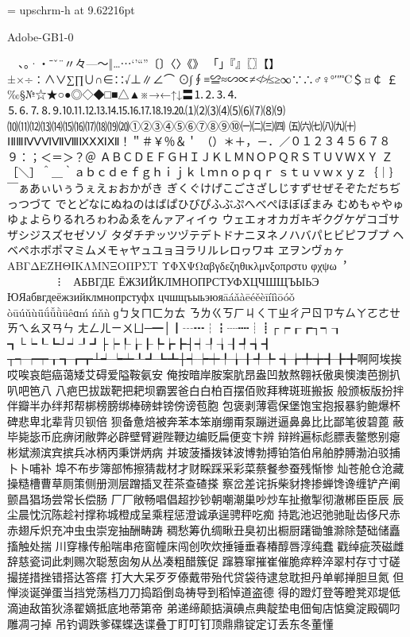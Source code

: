 %
%
%
\font\upschrm = upschrm-h at 9.62216pt
\upschrm

Adobe-GB1-0

　、。·・ˉˇ¨〃々—～‖…⋯‘’“”〔〕〈〉《》
「」『』〖〗【】±×÷∶∧∨∑∏∪∩∈∷√⊥∥∠⌒
⊙∫∮≡≌≈∽∝≠≮≯≤≥∞∵∴♂♀°′″℃＄¤￠
￡‰§№☆★○●◎◇◆□■△▲※→←↑↓〓⒈⒉⒊⒋
⒌⒍⒎⒏⒐⒑⒒⒓⒔⒕⒖⒗⒘⒙⒚⒛⑴⑵⑶⑷⑸⑹⑺⑻⑼
⑽⑾⑿⒀⒁⒂⒃⒄⒅⒆⒇①②③④⑤⑥⑦⑧⑨⑩㈠㈡㈢㈣
㈤㈥㈦㈧㈨㈩ⅠⅡⅢⅣⅤⅥⅦⅧⅨⅩⅪⅫ！＂＃￥％＆＇
（）＊＋，－．／０１２３４５６７８９：；＜＝＞？＠
ＡＢＣＤＥＦＧＨＩＪＫＬＭＮＯＰＱＲＳＴＵＶＷＸＹ
Ｚ［＼］＾＿｀ａｂｃｄｅｆｇｈｉｊｋｌｍｎｏｐｑｒ
ｓｔｕｖｗｘｙｚ｛｜｝￣ぁあぃいぅうぇえぉおかがき
ぎくぐけげこごさざしじすずせぜそぞただちぢっつづて
でとどなにぬねのはばぱひびぴふぶぷへべぺほぼぽまみ
むめもゃやゅゆょよらりるれろゎわゐゑをんァアィイゥ
ウェエォオカガキギクグケゲコゴサザシジスズセゼソゾ
タダチヂッツヅテデトドナニヌネノハバパヒビピフブプ
ヘベペホボポマミムメモャヤュユョヨラリルレロヮワヰ
ヱヲンヴヵヶΑΒΓΔΕΖΗΘΙΚΛΜΝΞΟΠΡΣΤ
ΥΦΧΨΩαβγδεζηθικλμνξοπρστυ
φχψω︐︒︑︓︔︕︖︵︶︹︺︿﹀︽
︾﹁﹂﹃﹄︗︘︻︼︷︸︱⁝︙︳︴АБВГДЕ
ЁЖЗИЙКЛМНОПРСТУФХЦЧШЩЪЫЬЭ
ЮЯабвгдеёжзийклмнопрстуфх
цчшщъыьэюяāáǎàēéěèīíǐìōóǒ
òūúǔùǖǘǚǜüêɑḿńňǹɡㄅㄆㄇㄈㄉㄊ
ㄋㄌㄍㄎㄏㄐㄑㄒㄓㄔㄕㄖㄗㄘㄙㄚㄛㄜㄝㄞㄟㄠㄡㄢㄣ
ㄤㄥㄦㄧㄨㄩ─━│┃┄┅┆┇┈┉┊┋┌┍┎┏┐┑┒
┓└┕┖┗┘┙┚┛├┝┞┟┠┡┢┣┤┥┦┧┨┩┪┫
┬┭┮┯┰┱┲┳┴┵┶┷┸┹┺┻┼┽┾┿╀╁╂╃╄
╅╆╇╈╉╊╋啊阿埃挨哎唉哀皑癌蔼矮艾碍爱隘鞍氨安
俺按暗岸胺案肮昂盎凹敖熬翱袄傲奥懊澳芭捌扒叭吧笆⼋
八疤巴拔跋靶把耙坝霸罢爸⽩白柏百摆佰败拜稗斑班搬扳
般颁板版扮拌伴瓣半办绊邦帮梆榜膀绑棒磅蚌镑傍谤苞胞
包褒剥薄雹保堡饱宝抱报暴豹鲍爆杯碑悲卑北辈背贝钡倍
狈备惫焙被奔苯本笨崩绷甭泵蹦迸逼⿐鼻⽐比鄙笔彼碧蓖
蔽毕毙毖币庇痹闭敝弊必辟壁臂避陛鞭边编贬扁便变卞辨
辩辫遍标彪膘表鳖憋别瘪彬斌濒滨宾摈兵冰柄丙秉饼炳病
并玻菠播拨钵波博勃搏铂箔伯帛舶脖膊渤泊驳捕⼘卜哺补
埠不布步簿部怖擦猜裁材才财睬踩采彩菜蔡餐参蚕残惭惨
灿苍舱仓沧藏操糙槽曹草厕策侧册测层蹭插叉茬茶查碴搽
察岔差诧拆柴豺搀掺蝉馋谗缠铲产阐颤昌猖场尝常长偿肠
⼚厂敞畅唱倡超抄钞朝嘲潮巢吵炒车扯撤掣彻澈郴⾂臣⾠
辰尘晨忱沉陈趁衬撑称城橙成呈乘程惩澄诚承逞骋秤吃痴
持匙池迟弛驰耻齿侈尺⾚赤翅斥炽充冲⾍虫崇宠抽酬畴踌
稠愁筹仇绸瞅丑臭初出橱厨躇锄雏滁除楚础储矗搐触处揣
川穿椽传船喘串疮窗幢床闯创吹炊捶锤垂春椿醇唇淳纯蠢
戳绰疵茨磁雌辞慈瓷词此刺赐次聪葱囱匆从丛凑粗醋簇促
蹿篡窜摧崔催脆瘁粹淬翠村存⼨寸磋撮搓措挫错搭达答瘩
打⼤大呆⽍歹傣戴带殆代贷袋待逮怠耽担丹单郸掸胆旦氮
但惮淡诞弹蛋当挡党荡档⼑刀捣蹈倒岛祷导到稻悼道盗德
得的蹬灯登等瞪凳邓堤低滴迪敌笛狄涤翟嫡抵底地蒂第帝
弟递缔颠掂滇碘点典靛垫电佃甸店惦奠淀殿碉叼雕凋刁掉
吊钓调跌爹碟蝶迭谍叠丁盯叮钉顶⿍鼎锭定订丢东冬董懂
